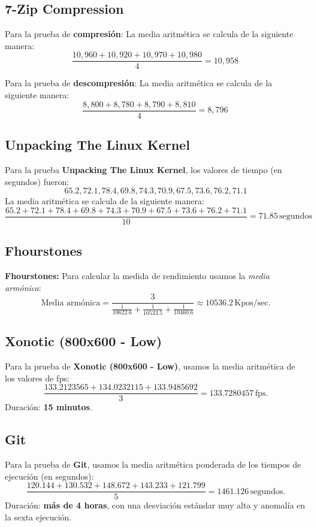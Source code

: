 \documentclass[12pt]{article}
\begin{document}
\begin{enumerate}[(3.2.1)]
\begin{itemize}
    \subsection*{7-Zip Compression}

Para la prueba de \textbf{compresión}:
La media aritmética se calcula de la siguiente manera:
\[
\frac{10,960 + 10,920 + 10,970 + 10,980}{4} = 10,958 \, 
\]

Para la prueba de \textbf{descompresión}:
La media aritmética se calcula de la siguiente manera:
\[
\frac{8,800 + 8,780 + 8,790 + 8,810}{4} = 8,796 \, 
\]

\subsection*{Unpacking The Linux Kernel}

Para la prueba \textbf{Unpacking The Linux Kernel}, los valores de tiempo (en segundos) fueron:
\[
65.2, 72.1, 78.4, 69.8, 74.3, 70.9, 67.5, 73.6, 76.2, 71.1
\]
La media aritmética se calcula de la siguiente manera:
\[
\frac{65.2 + 72.1 + 78.4 + 69.8 + 74.3 + 70.9 + 67.5 + 73.6 + 76.2 + 71.1}{10} = 71.85 \, \text{segundos}
\]

    \subsection*{Fhourstones}

\textbf{Fhourstones:} Para calcular la medida de rendimiento usamos la \textit{media armónica}:
\[
\text{Media armónica} = \frac{3}{\frac{1}{10622.6} + \frac{1}{10533.5} + \frac{1}{10460.6}} \approx 10536.2 \, \text{Kpos/sec}.
\]

\subsection*{Xonotic (800x600 - Low)}

Para la prueba de \textbf{Xonotic (800x600 - Low)}, usamos la media aritmética de los valores de fps:
\[
\frac{133.2123565 + 134.0232115 + 133.9485692}{3} = 133.7280457 \, \text{fps}.
\]
Duración: \textbf{15 minutos}.

\subsection*{Git}

Para la prueba de \textbf{Git}, usamos la media aritmética ponderada de los tiempos de ejecución (en segundos):
\[
\frac{120.144 + 130.532 + 148.672 + 143.233 + 121.799}{5} = 1461.126 \, \text{segundos}.
\]
Duración: \textbf{más de 4 horas}, con una desviación estándar muy alta y anomalía en la sexta ejecución.


\end{itemize}
\end{enumerate}
\end{document}
